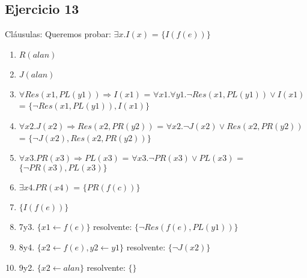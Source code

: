 \documentclass[10pt,a4paper]{article}
\begin{document}
\subsection{Ejercicio 13}
    Cláusulas:
    Queremos probar: $\exists x. I(x)$ = $\{I(f(e))\}$
    \begin{enumerate}
        \item $R(alan)$
        \item $J(alan)$
        \item $\forall Res(x1,PL(y1)) \Rightarrow I(x1)$ = $\forall x1. \forall y1. \neg Res(x1,PL(y1)) \vee I(x1)$ = $\{\neg Res(x1,PL(y1)), I(x1)\}$
        \item $\forall x2. J(x2) \Rightarrow Res(x2,PR(y2))$ = $\forall x2. \neg J(x2) \vee Res(x2,PR(y2))$  = $\{\neg J(x2), Res(x2,PR(y2))\}$ 
        \item $\forall x3. PR(x3) \Rightarrow PL(x3)$ = $\forall x3. \neg PR(x3) \vee PL(x3)$  = $\{\neg PR(x3), PL(x3)\}$
        \item $\exists x4. PR(x4)$ = $\{PR(f(c))\}$
        \item $\{I(f(e))\}$
        \item 7y3. $\{x1 \leftarrow f(e)\}$ resolvente: $\{\neg Res(f(e),PL(y1))\}$
        \item 8y4. $\{x2 \leftarrow f(e), y2 \leftarrow y1\}$ resolvente: $\{\neg J(x2)\}$ 
        \item 9y2. $\{x2 \leftarrow alan\}$ resolvente: $\{\}$
    \end{enumerate}
\end{document}
